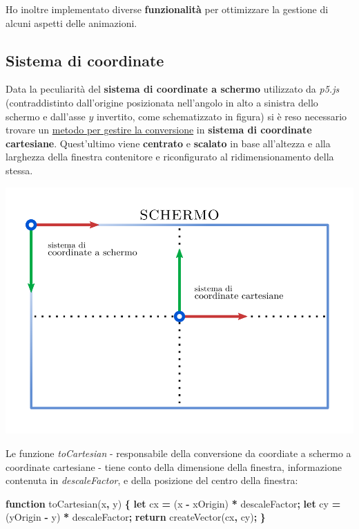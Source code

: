 \documentclass[
]{book}
\newenvironment{Shaded}{\begin{snugshade}}{\end{snugshade}}
\newcommand{\AttributeTok}[1]{\textcolor[rgb]{0.77,0.63,0.00}{#1}}
\newcommand{\ControlFlowTok}[1]{\textcolor[rgb]{0.13,0.29,0.53}{\textbf{#1}}}
\newcommand{\KeywordTok}[1]{\textcolor[rgb]{0.13,0.29,0.53}{\textbf{#1}}}
\newcommand{\NormalTok}[1]{#1}
\newcommand{\OperatorTok}[1]{\textcolor[rgb]{0.81,0.36,0.00}{\textbf{#1}}}
\begin{document}
Ho inoltre implementato diverse \textbf{funzionalità} per ottimizzare la gestione di alcuni aspetti delle animazioni.

\hypertarget{coordsystem}{%
\subsection{Sistema di coordinate}\label{coordsystem}}

Data la peculiarità del \textbf{sistema di coordinate a schermo} utilizzato da \emph{p5.js} (contraddistinto dall'origine posizionata nell'angolo in alto a sinistra dello schermo e dall'asse \(y\) invertito, come schematizzato in figura) si è reso necessario trovare un \href{https://github.com/Bradwave/thesis/blob/master/animations/js/utils/coordinateSystem.js}{metodo per gestire la conversione} in \textbf{sistema di coordinate cartesiane}. Quest'ultimo viene \textbf{centrato} e \textbf{scalato} in base all'altezza e alla larghezza della finestra contenitore e riconfigurato al ridimensionamento della stessa.

\begin{center}\includegraphics[width=0.6\linewidth]{_images/screen} \end{center}

Le funzione \emph{toCartesian} - responsabile della conversione da coordiate a schermo a coordinate cartesiane - tiene conto della dimensione della finestra, informazione contenuta in \emph{descaleFactor}, e della posizione del centro della finestra:

\begin{Shaded}
\begin{Highlighting}[]
\KeywordTok{function} \AttributeTok{toCartesian}\NormalTok{(x}\OperatorTok{,}\NormalTok{ y) }\OperatorTok{\{}
    \KeywordTok{let}\NormalTok{ cx }\OperatorTok{=}\NormalTok{ (x }\OperatorTok{-}\NormalTok{ xOrigin) }\OperatorTok{*}\NormalTok{ descaleFactor}\OperatorTok{;}
    \KeywordTok{let}\NormalTok{ cy }\OperatorTok{=}\NormalTok{ (yOrigin }\OperatorTok{-}\NormalTok{ y) }\OperatorTok{*}\NormalTok{ descaleFactor}\OperatorTok{;}
    \ControlFlowTok{return} \AttributeTok{createVector}\NormalTok{(cx}\OperatorTok{,}\NormalTok{ cy)}\OperatorTok{;}
\OperatorTok{\}}
\end{Highlighting}
\end{Shaded}
\end{document}
